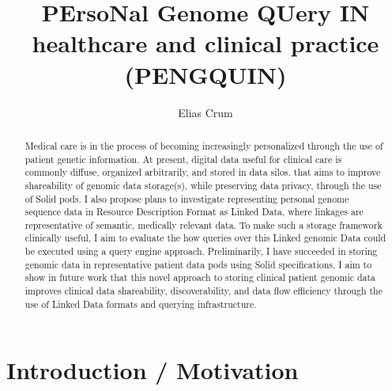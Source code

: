 \documentclass[runningheads]{llncs}
\begin{document}
\title{PErsoNal Genome QUery IN healthcare and clinical practice (PENGQUIN)}

\author{Elias Crum}



\maketitle

\begin{abstract}
	Medical care is in the process of becoming increasingly personalized through the use of patient genetic information. 
	At present, digital data useful for clinical care is commonly diffuse, organized arbitrarily, and stored in data silos. 
   that aims to improve shareability of genomic data storage(s), while preserving data privacy, through the use of Solid pods. 
	I also propose plans to investigate representing personal genome sequence data in Resource Description Format as Linked Data, where linkages are representative of semantic, medically relevant data.
	To make such a storage framework clinically useful, I aim to evaluate the how queries over this Linked genomic Data could be executed using a query engine approach.
	Preliminarily, I have succeeded in storing genomic data in representative patient data pods using Solid specifications. 
	I aim to show in future work that this novel approach to storing clinical patient genomic data improves clinical data shareability, discoverability, and data flow efficiency through the use of Linked Data formats and querying infrastructure.


\end{abstract}


\section{Introduction / Motivation}

\end{document}
